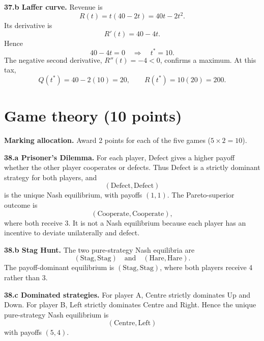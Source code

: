 \documentclass[11pt,a4paper]{article}
\begin{document}
\textbf{37.b Laffer curve.} Revenue is
\[
R(t)=t(40-2t)
=\boxed{40t-2t^2}.
\]
Its derivative is
\[
R'(t)=40-4t.
\]
Hence
\[
40-4t=0
\quad\Longrightarrow\quad
\boxed{t^*=10.}
\]
The negative second derivative, \(R''(t)=-4<0\), confirms a maximum. At
this tax,
\[
Q(t^*)=40-2(10)=\boxed{20},
\qquad
R(t^*)=10(20)=\boxed{200}.
\]

\begin{center}
\end{center}

\section{Game theory \hfill (10 points)}

\begin{tipbox}
\textbf{Marking allocation.} Award 2 points for each of the five games
(\(5\times2=10\)).
\end{tipbox}

\textbf{38.a Prisoner's Dilemma.} For each player, Defect gives a higher
payoff whether the other player cooperates or defects. Thus Defect is a
strictly dominant strategy for both players, and
\[
\boxed{(\text{Defect},\text{Defect})}
\]
is the unique Nash equilibrium, with payoffs \((1,1)\). The
Pareto-superior outcome is
\[
\boxed{(\text{Cooperate},\text{Cooperate})},
\]
where both receive 3. It is not a Nash equilibrium because each player has an
incentive to deviate unilaterally and defect.

\textbf{38.b Stag Hunt.} The two pure-strategy Nash equilibria are
\[
\boxed{(\text{Stag},\text{Stag})\quad\text{and}\quad
(\text{Hare},\text{Hare}).}
\]
The payoff-dominant equilibrium is \((\text{Stag},\text{Stag})\), where both
players receive 4 rather than 3.

\textbf{38.c Dominated strategies.} For player A, Centre strictly dominates
Up and Down. For player B, Left strictly dominates Centre and Right. Hence the
unique pure-strategy Nash equilibrium is
\[
\boxed{(\text{Centre},\text{Left})}
\]
with payoffs \((5,4)\).
\end{document}
